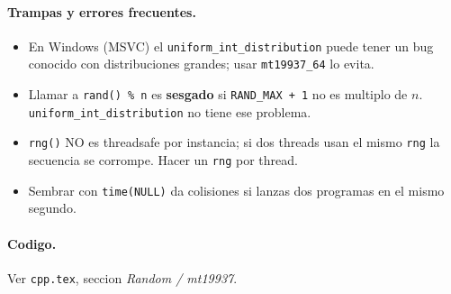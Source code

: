 \paragraph{Trampas y errores frecuentes.}
\begin{itemize}\setlength\itemsep{0pt}
	\item En Windows (MSVC) el \texttt{uniform\_int\_distribution} puede tener un bug conocido con distribuciones grandes; usar \texttt{mt19937\_64} lo evita.
	\item Llamar a \texttt{rand() \% n} es \textbf{sesgado} si \texttt{RAND\_MAX + 1} no es multiplo de $n$. \texttt{uniform\_int\_distribution} no tiene ese problema.
	\item \texttt{rng()} NO es threadsafe por instancia; si dos threads usan el mismo \texttt{rng} la secuencia se corrompe. Hacer un \texttt{rng} por thread.
	\item Sembrar con \texttt{time(NULL)} da colisiones si lanzas dos programas en el mismo segundo.
\end{itemize}

\paragraph{Codigo.}
Ver \texttt{cpp.tex}, seccion \textit{Random / mt19937}.

\vspace{0.5em}
